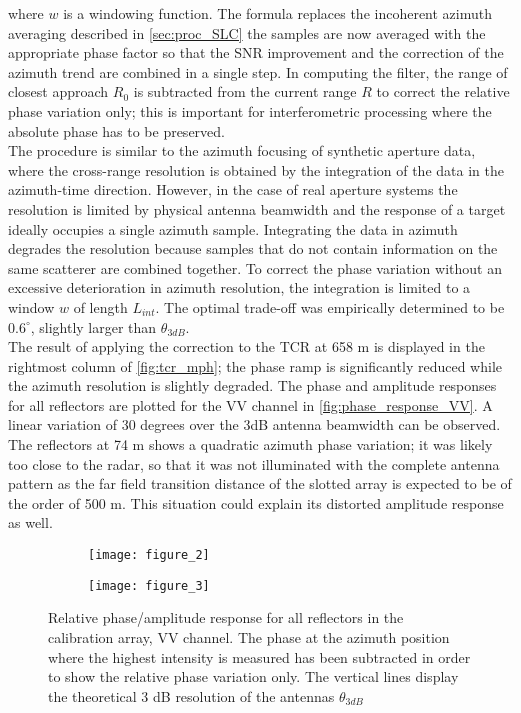 where $w$ is a windowing function. The formula replaces the incoherent azimuth averaging described in \autoref{sec:proc_SLC} the samples are now averaged with the appropriate phase factor so that the SNR improvement and the correction of the azimuth trend are combined in a single step. In computing the filter, the range of closest approach $R_{0}$ is subtracted from the current range $R$ to correct the relative phase variation only; this is important for interferometric processing where the absolute phase has to be preserved.\\
The procedure is similar to the azimuth focusing of synthetic aperture data, where the cross-range resolution is obtained by the integration of the data in the azimuth-time direction. However, in the case of real aperture systems the resolution is limited by  physical antenna beamwidth and the response of a target ideally occupies a single azimuth sample. Integrating the data in azimuth degrades the resolution because samples that do not contain information on the same scatterer are combined together. To correct the phase variation without an excessive deterioration in azimuth resolution, the integration is limited to a window  $w$ of length $L_{int}$. The optimal trade-off was empirically determined to be $0.6^\circ$, slightly larger than $\theta_{3dB}$.\\
The result of applying the correction to the TCR at 658 m is displayed in the rightmost column of \autoref{fig:tcr_mph}; the phase ramp is significantly reduced while the azimuth resolution is slightly degraded.
The phase and amplitude responses for all reflectors are plotted for the VV channel in \autoref{fig:phase_response_VV}. A linear variation of 30 degrees over the 3dB antenna beamwidth can be observed. The reflectors at 74 m shows a quadratic azimuth phase variation; it was likely too close to the radar, so that it was not illuminated with the complete antenna pattern as the far field transition distance of the slotted array is expected to be of the order of 500 m. This situation could explain its distorted amplitude response as well. 
\begin{figure}[ht]
	\begin{subfigure}[t]{\columnwidth}
		\texttt{[image: figure\_2]}
	\end{subfigure}
	\begin{subfigure}[t]{\columnwidth}
		\texttt{[image: figure\_3]}
	\end{subfigure}
	\caption{Relative phase/amplitude response for all reflectors in the calibration array, VV channel. The phase at the azimuth position where the highest intensity is measured has been subtracted in order to show the relative phase variation only. The vertical lines display the theoretical 3 dB resolution of the antennas $\theta_{3dB}$}
	\label{fig:phase_response_VV}
\end{figure}
